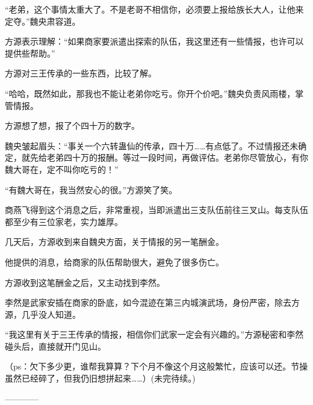 \begin{this_body}
“老弟，这个事情太重大了。不是老哥不相信你，必须要上报给族长大人，让他来定夺。”魏央肃容道。

方源表示理解：“如果商家要派遣出探索的队伍，我这里还有一些情报，也许可以提供些帮助。”

方源对三王传承的一些东西，比较了解。

“哈哈，既然如此，那我也不能让老弟你吃亏。你开个价吧。”魏央负责风雨楼，掌管情报。

方源想了想，报了个四十万的数字。

魏央皱起眉头：“事关一个六转蛊仙的传承，四十万……有点低了。不过情报还未确定，就先给老弟四十万的报酬。等过一段时间，再做评估。老弟你尽管放心，有你魏大哥在，定不叫你吃亏的！”

“有魏大哥在，我当然安心的很。”方源笑了笑。

商燕飞得到这个消息之后，非常重视，当即派遣出三支队伍前往三叉山。每支队伍都至少有三位家老，实力雄厚。

几天后，方源收到来自魏央方面，关于情报的另一笔酬金。

他提供的消息，给商家的队伍帮助很大，避免了很多伤亡。

方源收到这笔酬金之后，又主动找到李然。

李然是武家安插在商家的卧底，如今混迹在第三内城演武场，身份严密，除去方源，几乎没人知道。

“我这里有关于三王传承的情报，相信你们武家一定会有兴趣的。”方源秘密和李然碰头后，直接就开门见山。

（ps：欠下多少更，谁帮我算算？下个月不像这个月这般繁忙，应该可以还。节操虽然已经碎了，但我仍旧想拼起来……）(未完待续。)

------------

\end{this_body}

